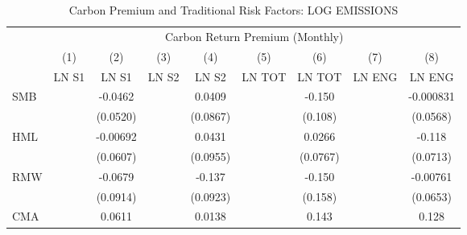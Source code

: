 \begin{table}[htbp]\centering
\def\sym#1{\ifmmode^{#1}\else\(^{#1}\)\fi}
\caption{Carbon Premium and Traditional Risk Factors: LOG EMISSIONS}
\begin{tabular}{l*{8}{c}}
\hline\hline
                    &\multicolumn{8}{c}{Carbon Return Premium (Monthly)}                                                                                                                            \\\cmidrule(lr){2-9}
                    &\multicolumn{1}{c}{(1)}&\multicolumn{1}{c}{(2)}&\multicolumn{1}{c}{(3)}&\multicolumn{1}{c}{(4)}&\multicolumn{1}{c}{(5)}&\multicolumn{1}{c}{(6)}&\multicolumn{1}{c}{(7)}&\multicolumn{1}{c}{(8)}\\
                    &\multicolumn{1}{c}{LN S1}&\multicolumn{1}{c}{LN S1}&\multicolumn{1}{c}{LN S2}&\multicolumn{1}{c}{LN S2}&\multicolumn{1}{c}{LN TOT}&\multicolumn{1}{c}{LN TOT}&\multicolumn{1}{c}{LN ENG}&\multicolumn{1}{c}{LN ENG}\\
\hline
SMB                 &                     &     -0.0462         &                     &      0.0409         &                     &      -0.150         &                     &   -0.000831         \\
                    &                     &    (0.0520)         &                     &    (0.0867)         &                     &     (0.108)         &                     &    (0.0568)         \\
HML                 &                     &    -0.00692         &                     &      0.0431         &                     &      0.0266         &                     &      -0.118         \\
                    &                     &    (0.0607)         &                     &    (0.0955)         &                     &    (0.0767)         &                     &    (0.0713)         \\
RMW                 &                     &     -0.0679         &                     &      -0.137         &                     &      -0.150         &                     &    -0.00761         \\
                    &                     &    (0.0914)         &                     &    (0.0923)         &                     &     (0.158)         &                     &    (0.0653)         \\
CMA                 &                     &      0.0611         &                     &      0.0138         &                     &       0.143         &                     &       0.128         \\

\end{tabular}
\end{table}
